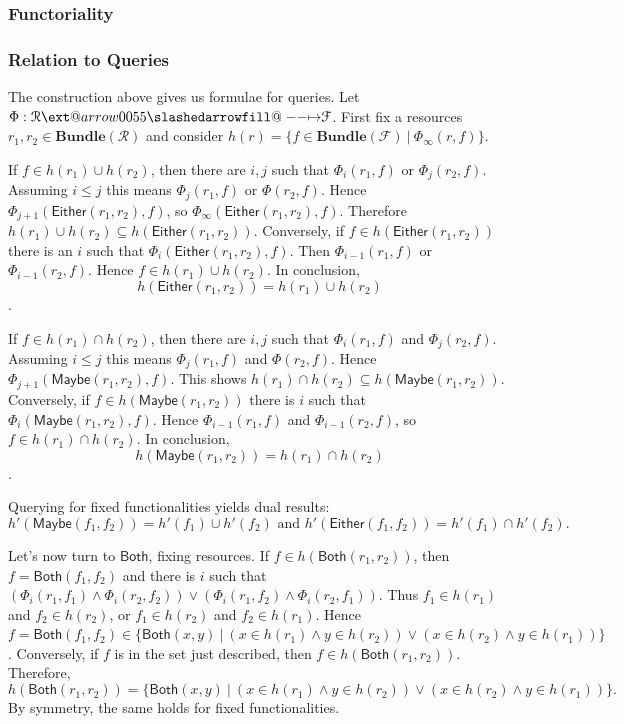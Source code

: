 \documentclass[12pt]{article}
\makeatletter
\theoremstyle{definition}
\theoremstyle{plain}
\theoremstyle{plain}
\theoremstyle{plain}
\theoremstyle{plain}
\theoremstyle{remark}
\theoremstyle{remark}
\newcommand{\mc}[1]{\mathcal{#1}}
\newcommand{\maybe}{\mathsf{Maybe}}
\newcommand{\either}{\mathsf{Either}}
\newcommand{\both}{\mathsf{Both}}
\newcommand{\sub}{\subseteq}
\def\slashedarrowfill@#1#2#3#4#5{%
	$\m@th\thickmuskip0mu\medmuskip\thickmuskip\thinmuskip\thickmuskip
	\relax#5#1\mkern-7mu%
	\cleaders\hbox{$#5\mkern-2mu#2\mkern-2mu$}\hfill
	\mathclap{#3}\mathclap{#2}%
	\cleaders\hbox{$#5\mkern-2mu#2\mkern-2mu$}\hfill
	\mkern-7mu#4$%
}
\def\rightslashedarrowfill@{%
	\slashedarrowfill@\relbar\relbar\mapstochar\rightarrow}
\newcommand\xslashedrightarrow[2][]{%
	\ext@arrow 0055{\rightslashedarrowfill@}{#1}{#2}}
\makeatother
\begin{document}
\subsubsection{Functoriality}

\subsubsection{Relation to Queries}
The construction above gives us formulae for queries. Let  $\Phi: \mc{R} \xslashedrightarrow{} \mc{F}$. First fix a resources $r_1,r_2 \in \mathbf{Bundle}(\mc{R})$ and consider $h(r) = \{f \in \mathbf{Bundle}(\mc{F}) \: | \: \Phi_\infty(r,f)\}$. 

If $f \in h(r_1) \cup h(r_2)$, then there are $i,j$ such that $\Phi_i(r_1,f)$ or $\Phi_j(r_2,f)$. Assuming $i \leq j$ this means $\Phi_j(r_1,f)$ or $\Phi(r_2,f)$. Hence $\Phi_{j+1}(\either(r_1,r_2),f)$, so $\Phi_\infty(\either(r_1,r_2),f)$. Therefore $h(r_1) \cup h(r_2) \sub h(\either(r_1,r_2))$. Conversely, if $f \in h(\either(r_1,r_2))$ there is an $i$ such that $\Phi_i(\either(r_1,r_2),f)$. Then $\Phi_{i-1}(r_1,f)$ or $\Phi_{i-1}(r_2,f)$. Hence $f \in h(r_1) \cup h(r_2)$. In conclusion, $$ h(\either(r_1,r_2)) = h(r_1) \cup h(r_2)$$.

If $f \in h(r_1) \cap h(r_2)$, then there are $i,j$ such that $\Phi_i(r_1,f)$ and $\Phi_j(r_2,f)$. Assuming $i \leq j$ this means $\Phi_j(r_1,f)$ and $\Phi(r_2,f)$. Hence $\Phi_{j+1}(\maybe(r_1,r_2),f)$. This shows $ h(r_1) \cap h(r_2) \sub h(\maybe(r_1,r_2))$. Conversely, if $f \in h(\maybe(r_1,r_2))$  there is $i$ such that $\Phi_i(\maybe(r_1,r_2),f)$. Hence $\Phi_{i-1}(r_1,f)$ and $\Phi_{i-1}(r_2,f)$, so $f \in  h(r_1) \cap h(r_2)$. In conclusion, $$h(\maybe(r_1,r_2)) = h(r_1) \cap h(r_2)$$.

Querying for fixed functionalities yields dual results: $$h'(\maybe(f_1,f_2)) = h'(f_1) \cup h'(f_2) \text{ and } h'(\either(f_1,f_2)) = h'(f_1) \cap h'(f_2).$$

Let's now turn to $\both$, fixing resources. If $f \in h(\both(r_1,r_2))$, then $f = \both(f_1,f_2)$ and there is $i$ such that $(\Phi_i(r_1,f_1) \wedge \Phi_i(r_2,f_2)) \vee (\Phi_i(r_1,f_2) \wedge \Phi_i(r_2,f_1))$. Thus $f_1 \in h(r_1)$ and $f_2 \in h(r_2)$, or $f_1 \in h(r_2)$ and $f_2 \in h(r_1)$. Hence $f = \both(f_1,f_2) \in \{\both(x,y) \:|\: (x \in h(r_1) \wedge y \in h(r_2)) \vee (x \in h(r_2) \wedge y \in h(r_1)) \}$. Conversely, if $f$ is in the set just described, then $f \in h(\both(r_1,r_2))$. Therefore,
$$ h(\both(r_1,r_2)) = \{\both(x,y) \:|\: (x \in h(r_1) \wedge y \in h(r_2)) \vee (x \in h(r_2) \wedge y \in h(r_1)) \}.$$
By symmetry, the same holds for fixed functionalities.
\end{document}
